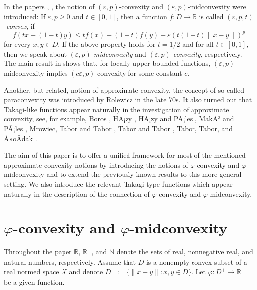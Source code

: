 \documentclass[12pt,leqno]{amsart}
\theoremstyle{definition}
\begin{document}
In the papers \cite{HazPal04}, \cite{HazPal05}, the notion of $({\varepsilon},p)$-convexity and
$({\varepsilon},p)$-midconvexity were introduced: If ${\varepsilon},p\geq0$ and $t\in[0,1]$, then
a function $f:D \to{\mathbb{R}}$ is called \textit{$({\varepsilon},p,t)$-convex}, if
$$
  f\left(t x+(1-t) y \right)
    \leq t f(x) + (1-t) f(y) + {\varepsilon} (t (1-t) \|x-y\|)^p
$$
for every $x,y\in D$. If the above property holds for $t=1/2$ and for all $t\in[0,1]$,
then we speak about \textit{$({\varepsilon},p)$-midconvexity} and \textit{$({\varepsilon},p)$-convexity}, 
respectively. The main result in \cite{HazPal05} shows that, for locally upper bounded 
functions, $({\varepsilon},p)$-midconvexity implies $(c{\varepsilon},p)$-convexity for some constant $c$.

Another, but related, notion of approximate convexity, the concept of so-called 
paraconvexity was introduced by Rolewicz \cite{Rol79b,Rol79a,Rol05b} in the late 70s.
It also turned out that Takagi-like functions appear naturally in the
investigation of approximate convexity, see, for example, Boros \cite{Bor08},
HÃ¡zy \cite{Haz07a,Haz07b}, HÃ¡zy and PÃ¡les \cite{HazPal04,HazPal05,HazPal09},
MakÃ³ and PÃ¡les \cite{MakPal11b,MakPal11a}, 
Mrowiec, Tabor and Tabor \cite{MroTabTab08}, Tabor and Tabor \cite{TabTab09b,TabTab09a},
Tabor, Tabor, and Å»oÅdak \cite{TabTabZol10a,TabTabZol10b}.

The aim of this paper is to offer a unified framework for most of the mentioned
approximate convexity notions by introducing the notions of $\varphi$-convexity and
$\varphi$-midconvexity and to extend the previously known results to this more general setting.
We also introduce the relevant Takagi type functions which appear naturally in the
description of the connection of $\varphi$-convexity and $\varphi$-midconvexity.

\section{$\varphi$-convexity and $\varphi$-midconvexity}

Throughout the paper ${\mathbb{R}}$, ${\mathbb{R}}_+$, and ${\mathbb{N}}$ denote the sets of real, nonnegative
real, and natural numbers, respectively.
Assume that $D$ is a nonempty convex subset of a real normed space $X$
and denote $D^+:=\{\|x-y\|:x,y\in D\}$. Let $\varphi:D^+\to {\mathbb{R}}_+$ be a given function.
\end{document}
